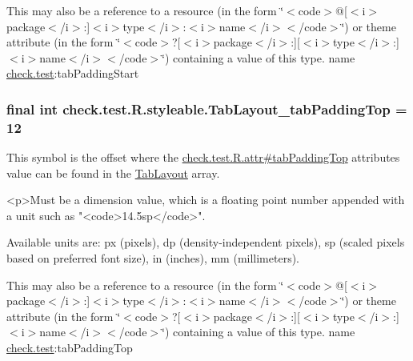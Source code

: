 This may also be a reference to a resource (in the form \char`\"{}$<$code$>$@\mbox{[}$<$i$>$package$<$/i$>$\+:\mbox{]}$<$i$>$type$<$/i$>$\+:$<$i$>$name$<$/i$>$$<$/code$>$\char`\"{}) or theme attribute (in the form \char`\"{}$<$code$>$?\mbox{[}$<$i$>$package$<$/i$>$\+:\mbox{]}\mbox{[}$<$i$>$type$<$/i$>$\+:\mbox{]}$<$i$>$name$<$/i$>$$<$/code$>$\char`\"{}) containing a value of this type.  name \hyperlink{namespacecheck_1_1test}{check.\+test}\+:tab\+Padding\+Start \hypertarget{classcheck_1_1test_1_1_r_1_1styleable_a17d7a02e6dcc33c6369bab9530248be5}{}
\subsubsection[{Tab\+Layout\+\_\+tab\+Padding\+Top}]{\setlength{\rightskip}{0pt plus 5cm}final int check.\+test.\+R.\+styleable.\+Tab\+Layout\+\_\+tab\+Padding\+Top = 12\hspace{0.3cm}{\ttfamily [static]}}\label{classcheck_1_1test_1_1_r_1_1styleable_a17d7a02e6dcc33c6369bab9530248be5}
This symbol is the offset where the \hyperlink{classcheck_1_1test_1_1_r_1_1attr_a85de95c6d92d95bb3ca0cc41458d1e48}{check.\+test.\+R.\+attr\#tab\+Padding\+Top} attribute\textquotesingle{}s value can be found in the \hyperlink{classcheck_1_1test_1_1_r_1_1styleable_a2a3232e8d38a43f5131a16385abbbed8}{Tab\+Layout} array.

\begin{DoxyVerb}      <p>Must be a dimension value, which is a floating point number appended with a unit such as "<code>14.5sp</code>".
\end{DoxyVerb}
 Available units are\+: px (pixels), dp (density-\/independent pixels), sp (scaled pixels based on preferred font size), in (inches), mm (millimeters). 

This may also be a reference to a resource (in the form \char`\"{}$<$code$>$@\mbox{[}$<$i$>$package$<$/i$>$\+:\mbox{]}$<$i$>$type$<$/i$>$\+:$<$i$>$name$<$/i$>$$<$/code$>$\char`\"{}) or theme attribute (in the form \char`\"{}$<$code$>$?\mbox{[}$<$i$>$package$<$/i$>$\+:\mbox{]}\mbox{[}$<$i$>$type$<$/i$>$\+:\mbox{]}$<$i$>$name$<$/i$>$$<$/code$>$\char`\"{}) containing a value of this type.  name \hyperlink{namespacecheck_1_1test}{check.\+test}\+:tab\+Padding\+Top \hypertarget{classcheck_1_1test_1_1_r_1_1styleable_a8de68a289b7ff055235fa32b1699d7c0}{}
